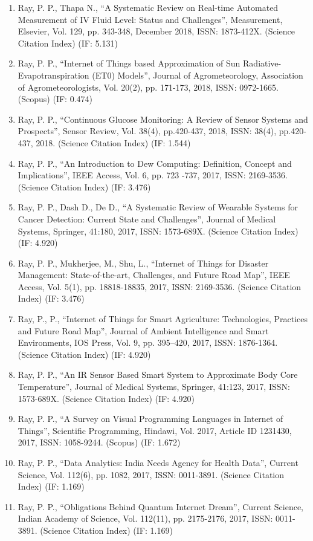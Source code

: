 \documentclass[11pt,a4paper]{moderncv}
\begin{document}
\begin{adjustwidth}{6em}{0pt}
\begin{enumerate}
		\item Ray, P. P., Thapa N., “A Systematic Review on Real-time Automated Measurement of IV Fluid Level: Status and Challenges”, Measurement, Elsevier, Vol. 129, pp. 343-348, December 2018, ISSN: 1873-412X. (Science Citation Index) (IF: 5.131)
		\item Ray, P. P., “Internet of Things based Approximation of Sun Radiative-Evapotranspiration (ET0) Models”, Journal of Agrometeorology, Association of Agrometeorologists, Vol. 20(2), pp. 171-173, 2018, ISSN: 0972-1665. (Scopus) (IF: 0.474)
		\item Ray, P. P., “Continuous Glucose Monitoring: A Review of Sensor Systems and Prospects”, Sensor Review, Vol. 38(4), pp.420-437, 2018, ISSN: 38(4), pp.420-437, 2018. (Science Citation Index) (IF: 1.544)
		\item Ray, P. P., “An Introduction to Dew Computing: Definition, Concept and Implications”, IEEE Access, Vol. 6, pp. 723 -737, 2017, ISSN: 2169-3536. (Science Citation Index) (IF: 3.476)
		\item Ray, P. P., Dash D., De D., “A Systematic Review of Wearable Systems for Cancer Detection: Current State and Challenges”, Journal of Medical Systems, Springer, 41:180, 2017, ISSN: 1573-689X. (Science Citation Index) (IF: 4.920)
		\item Ray, P. P., Mukherjee, M., Shu, L., “Internet of Things for Disaster Management: State-of-the-art, Challenges, and Future Road Map”, IEEE Access, Vol. 5(1), pp. 18818-18835, 2017, ISSN: 2169-3536. (Science Citation Index) (IF: 3.476)
		\item Ray, P., P., “Internet of Things for Smart Agriculture: Technologies, Practices and Future Road Map”, Journal of Ambient Intelligence and Smart Environments, IOS Press, Vol. 9, pp. 395–420, 2017, ISSN: 1876-1364. (Science Citation Index) (IF: 4.920)
		\item Ray, P. P., “An IR Sensor Based Smart System to Approximate Body Core Temperature”, Journal of Medical Systems, Springer, 41:123, 2017, ISSN: 1573-689X. (Science Citation Index) (IF: 4.920)
		\item Ray, P. P., “A Survey on Visual Programming Languages in Internet of Things”, Scientific Programming, Hindawi, Vol. 2017, Article ID 1231430, 2017, ISSN: 1058-9244. (Scopus) (IF: 1.672)
		\item Ray, P. P., “Data Analytics: India Needs Agency for Health Data”, Current Science, Vol. 112(6), pp. 1082, 2017, ISSN: 0011-3891. (Science Citation Index) (IF: 1.169)
		\item Ray, P. P., “Obligations Behind Quantum Internet Dream”, Current Science, Indian Academy of Science, Vol. 112(11), pp. 2175-2176, 2017, ISSN: 0011-3891. (Science Citation Index) (IF: 1.169)

\end{enumerate}
\end{adjustwidth}
\end{document}

